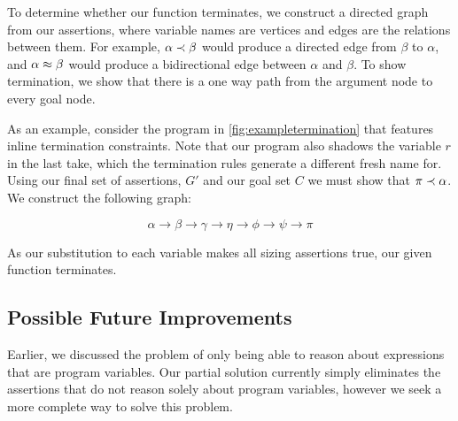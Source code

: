\FloatBarrier

To determine whether our function terminates, we construct a directed graph from
our assertions, where variable names are vertices and edges are the relations
between them. For example, $\alpha \prec \beta$ would produce a directed edge from
$\beta$ to $\alpha$, and $\alpha \approx \beta$ would produce a bidirectional edge between 
$\alpha$ and $\beta$. To show termination, we show that there is a one way path
from the argument node to every goal node.

As an example, consider the program in \autoref{fig:exampletermination} that
features inline termination constraints. Note that our program also shadows
the variable $r$ in the last take, which the termination
rules generate a different fresh name for. Using our final set of assertions,
$G'$ and our goal set $C$ we must show that $\pi \prec \alpha$.
We construct the following graph:


\[
    \alpha \rightarrow \beta \rightarrow \gamma \rightarrow
    \eta   \rightarrow \phi  \rightarrow \psi   \rightarrow
    \pi
\]

As our substitution to each variable makes all sizing assertions true,
our given function terminates.

\subsection{Possible Future Improvements}

Earlier, we discussed the problem of only being able to reason about expressions that are
program variables. Our partial solution currently simply eliminates the assertions that
do not reason solely about program variables, however we seek a more complete way to solve
this problem.

